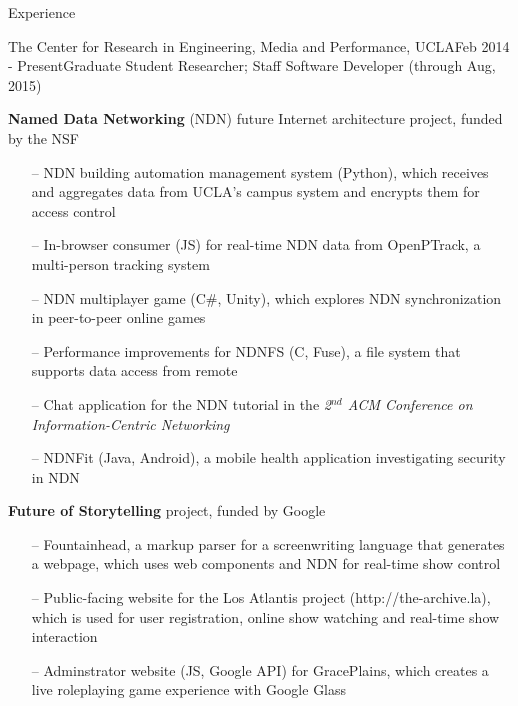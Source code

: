 \documentclass{resume} %
\begin{document}
\begin{rSection}{Experience}

\begin{rSubsection}{The Center for Research in Engineering, Media and Performance, UCLA}{Feb 2014 - Present}{Graduate Student Researcher; Staff Software Developer (through Aug, 2015)}{}
\item \textbf{Named Data Networking} (NDN) future Internet architecture project, funded by the NSF

\begin{itemize}[noitemsep,topsep=-6pt,leftmargin=1em]
\item[--] NDN building automation management system (Python), which receives and aggregates data from UCLA's campus system and encrypts them for access control
\item[--] In-browser consumer (JS) for real-time NDN data from OpenPTrack, a multi-person tracking system
\item[--] NDN multiplayer game (C\#, Unity), which explores NDN synchronization in peer-to-peer online games
\item[--] Performance improvements for NDNFS (C, Fuse), a file system that supports data access from remote
\item[--] Chat application for the NDN tutorial in the \textit{2$^{nd}$ ACM Conference on Information-Centric Networking}
\item[--] NDNFit (Java, Android), a mobile health application investigating security in NDN
\end{itemize}

\item \textbf{Future of Storytelling} project, funded by Google

\begin{itemize}[noitemsep,topsep=-6pt,leftmargin=1em]
\item[--] Fountainhead, a markup parser for a screenwriting language that generates a webpage, which uses web components and NDN for real-time show control
\item[--] Public-facing website for the Los Atlantis project (http://the-archive.la), which is used for user registration, online show watching and real-time show interaction
\item[--] Adminstrator website (JS, Google API) for GracePlains, which creates a live roleplaying game experience with Google Glass
\end{itemize}


\end{rSubsection}
\end{rSection}
\end{document}
